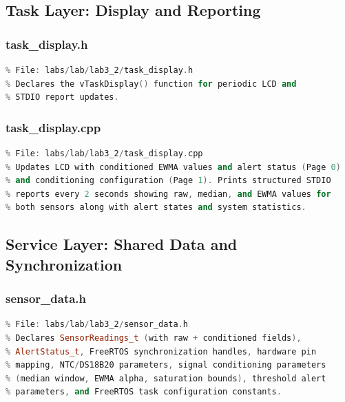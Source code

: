\subsection{Task Layer: Display and Reporting}

\subsubsection{task\_display.h}
\begin{lstlisting}[language=C++, caption=task\_display.h --- Display and Reporting Task Interface, label=lst:appendix_task_display_h]
% [Full source code - see GitHub repository]
% File: labs/lab/lab3_2/task_display.h
% Declares the vTaskDisplay() function for periodic LCD and
% STDIO report updates.
\end{lstlisting}

\subsubsection{task\_display.cpp}
\begin{lstlisting}[language=C++, caption=task\_display.cpp --- Display and Reporting Task Implementation, label=lst:appendix_task_display_cpp]
% [Full source code - see GitHub repository]
% File: labs/lab/lab3_2/task_display.cpp
% Updates LCD with conditioned EWMA values and alert status (Page 0)
% and conditioning configuration (Page 1). Prints structured STDIO
% reports every 2 seconds showing raw, median, and EWMA values for
% both sensors along with alert states and system statistics.
\end{lstlisting}


\subsection{Service Layer: Shared Data and Synchronization}

\subsubsection{sensor\_data.h}
\begin{lstlisting}[language=C++, caption=sensor\_data.h --- Shared Data Structures and Pin Mapping, label=lst:appendix_sensor_data_h]
% [Full source code - see GitHub repository]
% File: labs/lab/lab3_2/sensor_data.h
% Declares SensorReadings_t (with raw + conditioned fields),
% AlertStatus_t, FreeRTOS synchronization handles, hardware pin
% mapping, NTC/DS18B20 parameters, signal conditioning parameters
% (median window, EWMA alpha, saturation bounds), threshold alert
% parameters, and FreeRTOS task configuration constants.
\end{lstlisting}

